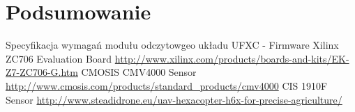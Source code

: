 \documentclass[a4paper,11pt,oneside]{book}  %
\begin{document}
\chapter{Podsumowanie}





\begin{thebibliography}{9}
 Specyfikacja wymagań modułu odczytowgeo układu UFXC - Firmware
 Xilinx ZC706 Evaluation Board \url{http://www.xilinx.com/products/boards-and-kits/EK-Z7-ZC706-G.htm}
 CMOSIS CMV4000 Sensor \url{http://www.cmosis.com/products/standard_products/cmv4000}
 CIS 1910F Sensor
 \url{http://www.steadidrone.eu/uav-hexacopter-h6x-for-precise-agriculture/}
\end{thebibliography}
\end{document}
